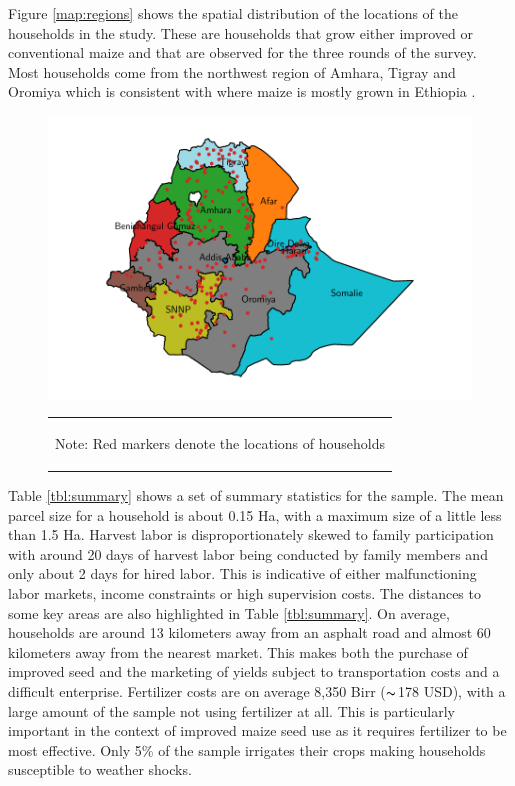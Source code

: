 \documentclass[11pt]{article}
\begin{document}
Figure \ref{map:regions} shows the spatial distribution of the locations of the households in the study. These are households that grow either improved or conventional maize and that are observed for the three rounds of the survey. Most households come from the northwest region of Amhara, Tigray and Oromiya which is consistent with where maize is mostly grown in Ethiopia \citep{Abate2015-rj}.

\begin{figure}[H]
    \centering
    \caption{Spatial Distribution of Households Surveyed}\label{map:regions}
    \includegraphics[width=.7\textwidth]{results/figures/map_hhids.pdf}
    \vspace*{-1em}
    \begin{table}[H]
        \centering
        \begin{tabular}{p{}} 
            \begin{tablenotes}
                  \small
                  \item Note: Red markers denote the locations of households
            \end{tablenotes}
        \end{tabular}
    \end{table}  
\end{figure}

Table \ref{tbl:summary} shows a set of summary statistics for the sample. The mean parcel size for a household is about 0.15 Ha, with a maximum size of a little less than 1.5 Ha. Harvest labor is disproportionately skewed to family participation with around 20 days of harvest labor being conducted by family members and only about 2 days for hired labor. This is indicative of either malfunctioning labor markets, income constraints or high supervision costs. The distances to some key areas are also highlighted in Table \ref{tbl:summary}. On average, households are around 13 kilometers away from an asphalt road and almost 60 kilometers away from the nearest market. This makes both the purchase of improved seed and the marketing of yields subject to transportation costs and a difficult enterprise. Fertilizer costs are on average 8,350 Birr ($\thicksim$178 USD), with a large amount of the sample not using fertilizer at all. This is particularly important in the context of improved maize seed use as it requires fertilizer to be most effective. Only 5\% of the sample irrigates their crops making households susceptible to weather shocks.
\end{document}
